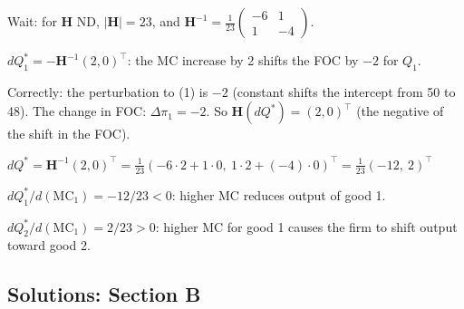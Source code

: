\documentclass[12pt, a4paper]{article}
\theoremstyle{definition}
\newcommand{\bH}{\mathbf{H}}
\begin{document}
\begin{solbox}
Wait: for $\bH$ ND, $|\bH|=23$, and $\bH^{-1}=\frac{1}{23}\begin{pmatrix}-6&1\\1&-4\end{pmatrix}$.

$dQ_1^* = -\bH^{-1}(2,0)^\top$: the MC increase by 2 shifts the FOC by $-2$ for $Q_1$.

Correctly: the perturbation to (1) is $-2$ (constant shifts the intercept from 50 to 48).
The change in FOC: $\Delta\pi_1 = -2$. So $\bH(dQ^*) = (2,0)^\top$
(the negative of the shift in the FOC).

$dQ^* = \bH^{-1}(2,0)^\top = \frac{1}{23}(-6\cdot2+1\cdot0,\ 1\cdot2+(-4)\cdot0)^\top
= \frac{1}{23}(-12,\ 2)^\top$

$dQ_1^*/d(\text{MC}_1) = -12/23 < 0$: higher MC reduces output of good 1. \checkmark

$dQ_2^*/d(\text{MC}_1) = 2/23 > 0$: higher MC for good 1 causes the firm to shift output toward good 2.
\end{solbox}

\subsection{Solutions: Section B}
\end{document}
